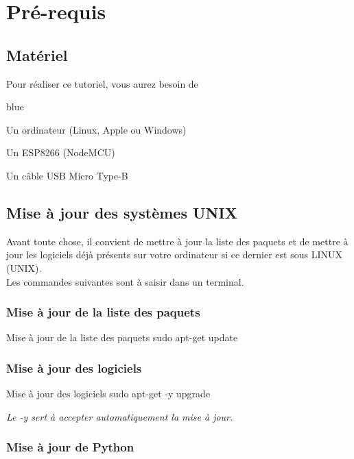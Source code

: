 \chapter{Pré-requis}

\section{Matériel}

Pour réaliser ce tutoriel, vous aurez besoin de 

\begin{items}{blue}{\Triangle}
    \item Un ordinateur (Linux, Apple ou Windows)
    \item Un ESP8266 (NodeMCU)
    \item Un câble USB Micro Type-B
    
\end{items}

\section{Mise à jour des systèmes UNIX}

Avant toute chose, il convient de mettre à jour la liste des paquets et de mettre à jour les logiciels déjà présents sur votre 
ordinateur si ce dernier est sous LINUX (UNIX). \\
Les commandes suivantes sont à saisir dans un terminal.

\subsection{Mise à jour de la liste des paquets}

\begin{Bash}{Mise à jour de la liste des paquets}
sudo apt-get update
\end{Bash}


\subsection{Mise à jour des logiciels}
\begin{Bash}{Mise à jour des logiciels}
sudo apt-get -y upgrade
\end{Bash}

\textit{Le -y sert à accepter automatiquement la mise à jour.}

\subsection{Mise à jour de Python}

